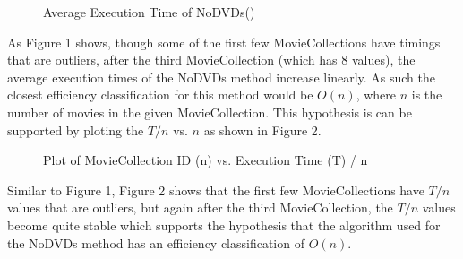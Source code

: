 \documentclass[12pt,a4paper]{article}
\begin{document}
			\begin{figure}[h]
				\centering
				\caption{Average Execution Time of NoDVDs()}
			\end{figure}
			
			As Figure 1 shows, though some of the first few MovieCollections have 
			timings that are outliers, after the third MovieCollection (which has 8 values), the average 
			execution times of the NoDVDs method increase linearly. As such the closest efficiency 
			classification for this method would be $O(n)$, where $n$ is the number of movies in the
			given MovieCollection. This hypothesis is can be supported by ploting the $T/n$ vs. $n$ as 
			shown in Figure 2.\\

			\newpage

			\begin{figure}[h]
				\centering
				\caption{Plot of MovieCollection ID (n) vs. Execution Time (T) / n}
				\label{fig:execution_time_over_n_plot}
			\end{figure}
			
			Similar to Figure 1, Figure 2 shows that the first few MovieCollections have 
			$T/n$ values that are outliers, but again after the third MovieCollection, the $T/n$ 
			values become quite stable which supports the hypothesis that the algorithm used 
			for the NoDVDs method has an efficiency classification of $O(n)$.\\
		
\end{document}
